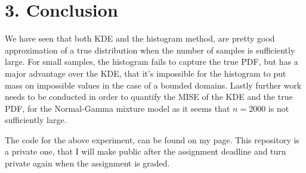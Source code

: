 \documentclass[fleqn, a4paper]{report}
\begin{document}
\section*{3. Conclusion}
We have seen that both KDE and the histogram method, are pretty good approximation of a true distribution when the number of samples is sufficiently large. For small samples, the histogram fails to capture the true PDF, but has a major advantage over the KDE, that it's impossible for the histogram to put mass on impossible values in the case of a bounded domains. Lastly further work needs to be conducted in order to quantify the MISE of the KDE and the true PDF, for the Normal-Gamma mixture model as it seems that $n=2000$ is not sufficiently large.

The code for the above experiment, can be found on my \href{https://github.com/TedOiler/SRS/tree/master/Assignment_2}{\faGithub} page. This repository is a private one, that I will make public after the assignment deadline and turn private again when the assignment is graded.



\end{document}
